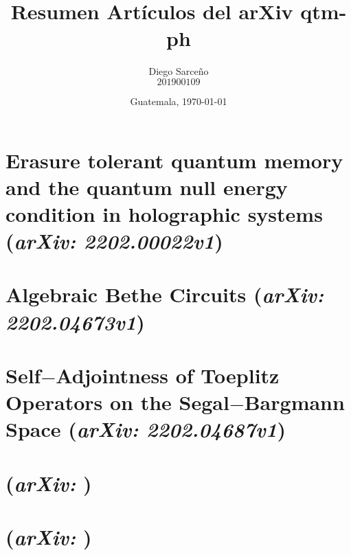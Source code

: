 





\title{\sc Resumen Artículos del arXiv qtm-ph}%
\author{Diego Sarceño \\ $201900109$}
\date{Guatemala, \today}

  
\maketitle





\section{Erasure tolerant quantum memory and the quantum null energy condition in holographic systems (\textit{arXiv: 2202.00022v1})}
\justify
\lipsum[1]

\section{Algebraic Bethe Circuits (\textit{arXiv: 2202.04673v1})}
\justify
\lipsum[1]

\section{Self$-$Adjointness of Toeplitz Operators on the Segal$-$Bargmann Space (\textit{arXiv: 2202.04687v1})}
\justify
\lipsum[1]

\section{ (\textit{arXiv: })}
\justify
\lipsum[1]

\section{ (\textit{arXiv: })}
\justify
\lipsum[1]

